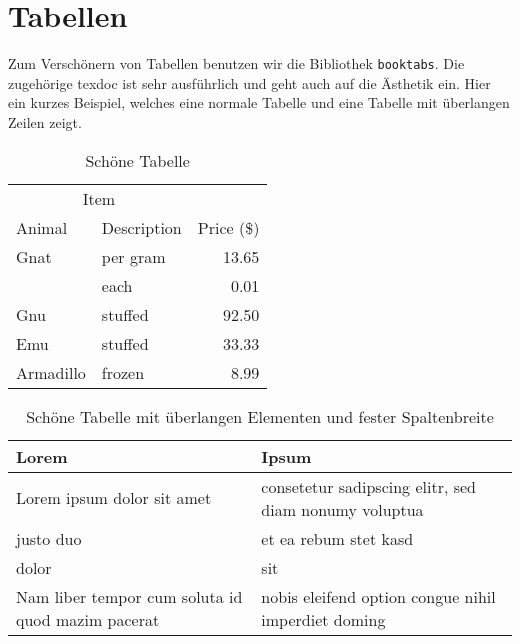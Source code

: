 \section{Tabellen}
\label{sec:tables}

Zum Verschönern von Tabellen benutzen wir die Bibliothek \texttt{booktabs}. Die
zugehörige texdoc ist sehr ausführlich und geht auch auf die Ästhetik ein. Hier
ein kurzes Beispiel, welches eine normale Tabelle und eine Tabelle mit
überlangen Zeilen zeigt.

\begin{table}[ht]
  \begin{tabular}{llr}
    \toprule
    \multicolumn{2}{c}{Item} \\
    \cmidrule(r){1-2}
    Animal & Description & Price (\$) \\
    \midrule
    Gnat  & per gram & 13.65 \\
          & each     &  0.01 \\
    Gnu   & stuffed  & 92.50 \\
    Emu   & stuffed  & 33.33 \\
    Armadillo & frozen & 8.99 \\
    \bottomrule
  \end{tabular}
  \caption{Schöne Tabelle}
  \label{fig:table:nice}
\end{table}

\begin{table}[ht]
    \begin{tabular}{p{4cm}p{7cm}}
    \toprule
    Lorem & Ipsum \\
    \midrule
    Lorem ipsum dolor sit amet & consetetur sadipscing elitr, sed diam nonumy voluptua \\
    justo duo & et ea rebum stet kasd \\
    dolor & sit \\
    Nam liber tempor cum soluta id quod mazim pacerat & nobis eleifend option congue nihil imperdiet doming \\
    \bottomrule
  \end{tabular}
  \caption{Schöne Tabelle mit überlangen Elementen und fester Spaltenbreite}
  \label{fig:table:nicebutlong}
\end{table}


